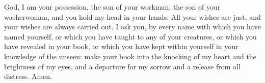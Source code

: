 God, I am your possession, the son of your workman, the son of your washerwoman, and you hold my head in your hands. All your wishes are just, and your wishes are always carried out. I ask you, by every name with which you have named yourself, or which you have taught to any of your creatures, or which you have revealed in your book, or which you have kept within yourself in your knowledge of the unseen: make your book into the knocking of my heart and the brightness of my eyes, and a departure for my sorrow and a release from all distress. Amen.
